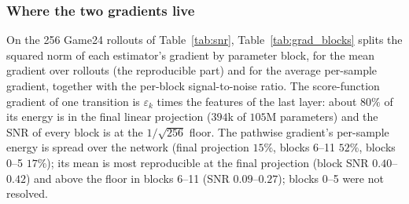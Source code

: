 \iffalse
\subsubsection{Where the two gradients live}
\label{app:grad_blocks}
On the 256 Game24 rollouts of Table~\ref{tab:snr}, Table~\ref{tab:grad_blocks} splits the squared norm of each estimator's gradient by parameter block, for the mean gradient over rollouts (the reproducible part) and for the average per-sample gradient, together with the per-block signal-to-noise ratio. The score-function gradient of one transition is $\varepsilon_k$ times the features of the last layer: about $80\%$ of its energy is in the final linear projection ($394$k of $105$M parameters) and the SNR of every block is at the $1/\sqrt{256}$ floor. The pathwise gradient's per-sample energy is spread over the network (final projection $15\%$, blocks 6--11 $52\%$, blocks 0--5 $17\%$); its mean is most reproducible at the final projection (block SNR $0.40$--$0.42$) and above the floor in blocks 6--11 (SNR $0.09$--$0.27$); blocks 0--5 were not resolved.
\begin{table}[H]\centering\small
\caption{Share of the gradient's squared norm by parameter block (mean gradient / average per-sample gradient) and block SNR, Game24, steps 16 and 24 of 64.}\label{tab:grad_blocks}
\end{table}

